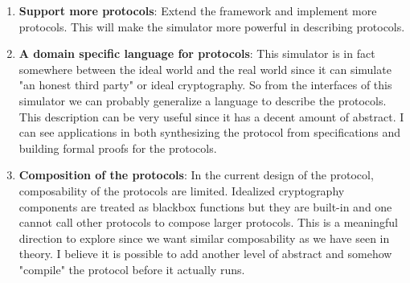 \documentclass{article}
\begin{document}
	\begin{enumerate}
		\item \textbf{Support more protocols}: Extend the framework and implement more protocols. This will make the simulator more powerful in describing protocols.
		\item \textbf{A domain specific language for protocols}: This simulator is in fact somewhere between the ideal world and the real world since it can simulate "an honest third party" or ideal cryptography. So from the interfaces of this simulator we can probably generalize a language to describe the protocols. This description can be very useful since it has a decent amount of abstract. I can see applications in both synthesizing the protocol from specifications and building formal proofs for the protocols.
		\item \textbf{Composition of the protocols}: In the current design of the protocol, composability of the protocols are limited. Idealized cryptography components are treated as blackbox functions but they are built-in and one cannot call other protocols to compose larger protocols. This is a meaningful direction to explore since we want similar composability as we have seen in theory. I believe it is possible to add another level of abstract and somehow "compile" the protocol before it actually runs.
	\end{enumerate}

	\printbibliography
\end{document}
